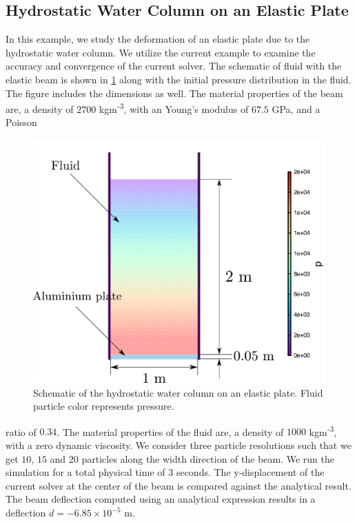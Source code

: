 \subsection{Hydrostatic Water Column on an Elastic Plate}
\label{sec:hydrostatic-water-column-on-an-composite-elastic-plate}
In this example, we study the deformation of an elastic plate due to the
hydrostatic water column. We utilize the current example to examine the accuracy
and convergence of the current solver. The schematic of fluid with the elastic
beam is shown in \cref{fig:hs-water-on-plate} along with the initial pressure
distribution in the fluid. The figure includes the dimensions as well. The
material properties of the beam are, a density of $2700$
kgm\textsuperscript{-3}, with an Young's modulus of $67.5$ GPa, and a Poisson
\begin{figure}
  \centering
  \includegraphics[scale=0.4]{images/fsi/images/ng_2020_hydrostatic_water_column_on_elastic_plate/schematic}
  \caption{Schematic of the hydrostatic water column on an elastic plate. Fluid
    particle color represents pressure.}
\label{fig:hs-water-on-plate}
\end{figure}
ratio of $0.34$. The material properties of the fluid are, a density of $1000$
kgm\textsuperscript{-3}, with a zero dynamic viscosity. We consider three particle
resolutions such that we get $10$, $15$ and $20$ particles along the width
direction of the beam. We run the simulation for a total physical time of $3$
seconds. The y-displacement of the current solver at the center of the beam is
compared against the analytical result. The beam deflection computed using
an analytical expression results in a deflection $d = -6.85 \times 10^{-5}$ m.

